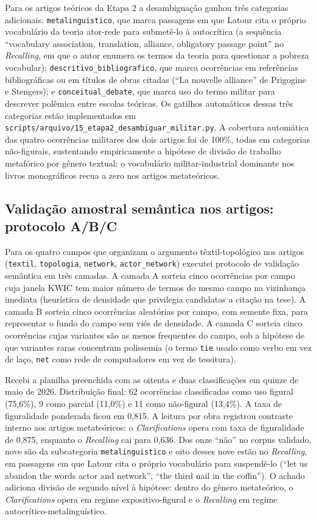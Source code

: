 Para os artigos teóricos da Etapa 2 a desambiguação ganhou três categorias adicionais: \texttt{metalinguistico}, que marca passagens em que Latour cita o próprio vocabulário da teoria ator-rede para submetê-lo à autocrítica (a sequência \enquote{vocabulary association, translation, alliance, obligatory passage point} no \emph{Recalling}, em que o autor enumera os termos da teoria para questionar a pobreza vocabular); \texttt{descritivo\_bibliografico}, que marca ocorrências em referências bibliográficas ou em títulos de obras citadas (\enquote{La nouvelle alliance} de Prigogine e Stengers); e \texttt{conceitual\_debate}, que marca uso do termo militar para descrever polêmica entre escolas teóricas. Os gatilhos automáticos dessas três categorias estão implementados em \texttt{scripts/arquivo/15\_etapa2\_desambiguar\_militar.py}. A cobertura automática das quatro ocorrências militares dos dois artigos foi de 100\%, todas em categorias não-figurais, sustentando empiricamente a hipótese de divisão de trabalho metafórico por gênero textual: o vocabulário militar-industrial dominante nos livros monográficos recua a zero nos artigos metateóricos.

\subsection{Validação amostral semântica nos artigos: protocolo A/B/C}

Para os quatro campos que organizam o argumento têxtil-topológico nos artigos (\texttt{textil}, \texttt{topologia}, \texttt{network}, \texttt{actor\_network}) executei protocolo de validação semântica em três camadas. A camada A sorteia cinco ocorrências por campo cuja janela KWIC tem maior número de termos do mesmo campo na vizinhança imediata (heurística de densidade que privilegia candidatas a citação na tese). A camada B sorteia cinco ocorrências aleatórias por campo, com semente fixa, para representar o fundo do campo sem viés de densidade. A camada C sorteia cinco ocorrências cujas variantes são as menos frequentes do campo, sob a hipótese de que variantes raras concentram polissemia (o termo \texttt{tie} usado como verbo em vez de laço, \texttt{net} como rede de computadores em vez de tessitura).

Recebi a planilha preenchida com as oitenta e duas classificações em quinze de maio de 2026. Distribuição final: 62 ocorrências classificadas como uso figural (75,6\%), 9 como parcial (11,0\%) e 11 como não-figural (13,4\%). A taxa de figuralidade ponderada ficou em 0,815. A leitura por obra registrou contraste interno aos artigos metateóricos: o \emph{Clarifications} opera com taxa de figuralidade de 0,875, enquanto o \emph{Recalling} cai para 0,636. Dos onze \enquote{não} no corpus validado, nove são da subcategoria \texttt{metalinguistico} e oito desses nove estão no \emph{Recalling}, em passagens em que Latour cita o próprio vocabulário para suspendê-lo (\enquote{let us abandon the words actor and network}, \enquote{the third nail in the coffin}). O achado adiciona divisão de segundo nível à hipótese: dentro do gênero metateórico, o \emph{Clarifications} opera em regime expositivo-figural e o \emph{Recalling} em regime autocrítico-metalinguístico.

